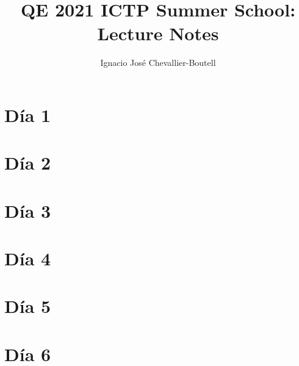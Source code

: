 \documentclass[12pt,final,twoside,onecolumn,openright,titlepage]{book}
\title{\Huge \bf{QE 2021 ICTP Summer School: Lecture Notes}}
\author{Ignacio José Chevallier-Boutell}
\date{}%
\numberwithin{equation}{section}  %
\begin{document}
    \maketitle
    \thispagestyle{empty}

    \frontmatter
        \pagestyle{fancy}
        \fancyhead{}
        \renewcommand{\headrulewidth}{1pt}
        \tableofcontents  %

    \mainmatter
        \pagestyle{fancy}
        \fancyhead{}
        \renewcommand{\headrulewidth}{1pt}


    \chapter{Día 1}

      

    \chapter{Día 2}

      

    \chapter{Día 3}

      

    \chapter{Día 4}

      

    \chapter{Día 5}

      

    \chapter{Día 6}

      
\end{document}
